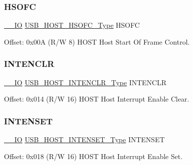 \subsubsection{\texorpdfstring{HSOFC}{HSOFC}}
{\footnotesize\ttfamily \mbox{\hyperlink{core__cm0plus_8h_aec43007d9998a0a0e01faede4133d6be}{\+\_\+\+\_\+\+IO}} \mbox{\hyperlink{union_u_s_b___h_o_s_t___h_s_o_f_c___type}{U\+S\+B\+\_\+\+H\+O\+S\+T\+\_\+\+H\+S\+O\+F\+C\+\_\+\+Type}} H\+S\+O\+FC}



Offset\+: 0x00A (R/W 8) H\+O\+ST Host Start Of Frame Control. 

\mbox{\label{struct_usb_host_aafd20ac677f26b7ae351e011ce8453d9}} 
\subsubsection{\texorpdfstring{INTENCLR}{INTENCLR}}
{\footnotesize\ttfamily \mbox{\hyperlink{core__cm0plus_8h_aec43007d9998a0a0e01faede4133d6be}{\+\_\+\+\_\+\+IO}} \mbox{\hyperlink{union_u_s_b___h_o_s_t___i_n_t_e_n_c_l_r___type}{U\+S\+B\+\_\+\+H\+O\+S\+T\+\_\+\+I\+N\+T\+E\+N\+C\+L\+R\+\_\+\+Type}} I\+N\+T\+E\+N\+C\+LR}



Offset\+: 0x014 (R/W 16) H\+O\+ST Host Interrupt Enable Clear. 

\mbox{\label{struct_usb_host_a42b381acfa790828dcbf1f08c09467b0}} 
\subsubsection{\texorpdfstring{INTENSET}{INTENSET}}
{\footnotesize\ttfamily \mbox{\hyperlink{core__cm0plus_8h_aec43007d9998a0a0e01faede4133d6be}{\+\_\+\+\_\+\+IO}} \mbox{\hyperlink{union_u_s_b___h_o_s_t___i_n_t_e_n_s_e_t___type}{U\+S\+B\+\_\+\+H\+O\+S\+T\+\_\+\+I\+N\+T\+E\+N\+S\+E\+T\+\_\+\+Type}} I\+N\+T\+E\+N\+S\+ET}



Offset\+: 0x018 (R/W 16) H\+O\+ST Host Interrupt Enable Set. 

\mbox{\label{struct_usb_host_a5a5d6b646599bd8af79f47b297f5552f}} 
